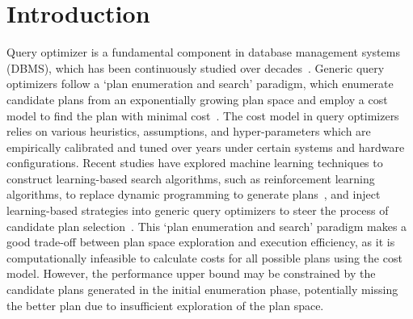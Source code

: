 \section{Introduction}
Query optimizer is a fundamental component in database management systems (DBMS), which has been continuously studied over decades~\cite{DBLP:books/sp/KimRB85, DBLP:books/mk/FreytagMV91, DBLP:journals/csur/JarkeK84}. 
Generic query optimizers follow a `plan enumeration and search' paradigm, which enumerate candidate plans from an exponentially growing plan space and employ a cost model to find the plan with minimal cost~\cite{DBLP:conf/sigmod/SelingerACLP79, DBLP:journals/csur/Graefe93, DBLP:conf/job/Leis18, DBLP:conf/pods/Chaudhuri98}. 
The cost model in query optimizers relies on various heuristics, assumptions, and hyper-parameters which are empirically calibrated and tuned over years under certain systems and hardware configurations. Recent studies have explored machine learning techniques to construct learning-based search algorithms, such as reinforcement learning algorithms, to replace dynamic programming to generate plans~\cite{DBLP:journals/corr/abs-1808-03196, DBLP:conf/kdd/0008Y000CZ022, DBLP:conf/icde/Yu0C020, DBLP:journals/pvldb/MarcusNMZAKPT19}, and inject learning-based strategies into generic query optimizers to steer the process of candidate plan selection~\cite{DBLP:conf/sigmod/MarcusNMTAK21, DBLP:journals/pvldb/YuC0L22, DBLP:journals/pvldb/ZhuCDCPWZ23}. 
%
This `plan enumeration and search' paradigm makes a good trade-off between plan space exploration and execution efficiency, as it is computationally infeasible to calculate costs for all possible plans using the cost model. However, the performance upper bound may be constrained by the candidate plans generated in the initial enumeration phase, potentially missing the better plan due to insufficient exploration of the plan space. 

